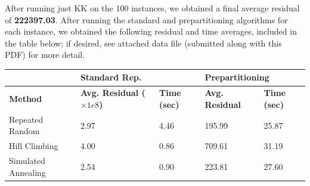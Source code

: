 \documentclass[a4paper]{article}
\begin{document}
	After running just KK on the 100 instances, we obtained a final average residual of \textbf{222397.03}. After running the standard and prepartitioning algorithms for each instance, we obtained the following residual and time averages, included in the table below; if desired, see attached data file (submitted along with this PDF) for more detail. 
	
\begin{tabular}{l|ll|ll}
\textbf{}           & \multicolumn{2}{l|}{\textbf{Standard Rep.}}               & \multicolumn{2}{l|}{\textbf{Prepartitioning}} \\ \hline
\textbf{Method}     & \textbf{Avg. Residual ($\times 1e8$)} & \textbf{Time (sec)} & \textbf{Avg. Residual}  & \textbf{Time (sec)} \\ \hline
Repeated Random     & 2.97                                & 4.46                & 195.99                  & 25.87               \\
Hill Climbing       & 4.00                                & 0.86                & 709.61                  & 31.19               \\
Simulated Annealing & 2.54                                & 0.90                & 223.81                  & 27.60              
\end{tabular}
	
\end{document}
